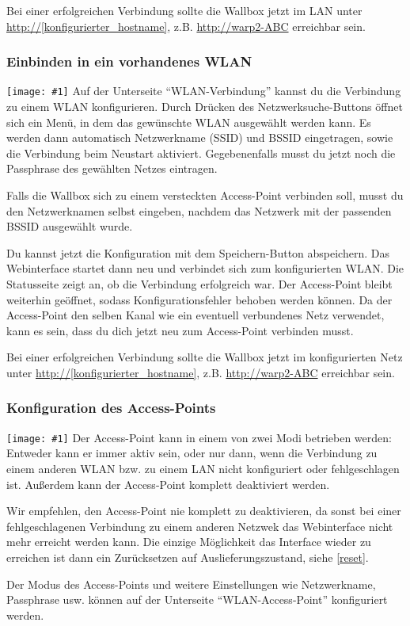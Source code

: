 \documentclass[a4paper,10pt]{article}
\newcommand{\hint}[1]{\begin{tcolorbox}[colback=boxgray,colframe=black,coltext=
white,title=Hinweis,left*=2mm,right*=2mm,boxsep=1mm,bottom=1mm,top=1mm]#1\end{tcolorbox}}
\newcommand{\gfx}[1]{\texttt{[image: \#1]}}
\begin{document}
\begin{multicols*}{2}
	Bei einer erfolgreichen Verbindung sollte die Wallbox jetzt im LAN unter
	\url{http://[konfigurierter_hostname]}, z.B. \url{http://warp2-ABC} erreichbar sein.

	\subsubsection{Einbinden in ein vorhandenes WLAN}
	\gfx{./img_warp2/resized/web_wifi_sta}
	Auf der Unterseite \enquote{WLAN-Verbindung} kannst du die Verbindung zu einem WLAN konfigurieren.
	Durch Drücken des Netzwerksuche-Buttons öffnet sich ein Menü, in dem das gewünschte WLAN ausgewählt werden kann.
	Es werden dann automatisch Netzwerkname (SSID) und BSSID eingetragen, sowie die Verbindung beim Neustart aktiviert.
	Gegebenenfalls musst du jetzt noch die Passphrase des gewählten Netzes eintragen.

	Falls die Wallbox sich zu einem versteckten Access-Point verbinden soll, musst du den Netzwerknamen selbst eingeben,
	nachdem das Netzwerk mit der passenden BSSID ausgewählt wurde.


	Du kannst jetzt die Konfiguration mit dem Speichern-Button abspeichern.
	Das Webinterface startet dann neu und verbindet sich zum konfigurierten WLAN. Die Statusseite zeigt
	an, ob die Verbindung erfolgreich war. Der Access-Point bleibt weiterhin
	geöffnet, sodass Konfigurationsfehler behoben werden können.
	Da der Access-Point den selben Kanal wie ein eventuell verbundenes Netz verwendet,
	kann es sein, dass du dich jetzt neu zum Access-Point verbinden musst.

	Bei einer erfolgreichen Verbindung sollte die Wallbox jetzt im konfigurierten Netz unter
	\url{http://[konfigurierter_hostname]}, z.B. \url{http://warp2-ABC} erreichbar sein.

	\newpage
	\subsubsection{Konfiguration des Access-Points}
	\gfx{./img_warp2/resized/web_wifi_ap}
	Der Access-Point kann in einem von zwei Modi betrieben werden: Entweder kann er immer aktiv sein,
	oder nur dann, wenn die Verbindung zu einem anderen WLAN bzw. zu einem LAN nicht konfiguriert oder fehlgeschlagen ist.
	Außerdem kann der Access-Point komplett deaktiviert werden.
	\hint{Wir empfehlen, den Access-Point nie komplett zu deaktivieren, da sonst bei einer
		fehlgeschlagenen Verbindung zu einem anderen Netzwek das Webinterface nicht mehr erreicht
		werden kann. Die einzige Möglichkeit das Interface wieder zu erreichen ist dann ein Zurücksetzen auf Auslieferungszustand, siehe \ref{reset}.}
	Der Modus des Access-Points und weitere Einstellungen wie Netzwerkname, Passphrase usw. können
	auf der Unterseite \enquote{WLAN-Access-Point} konfiguriert werden.


\end{multicols*}
\end{document}
